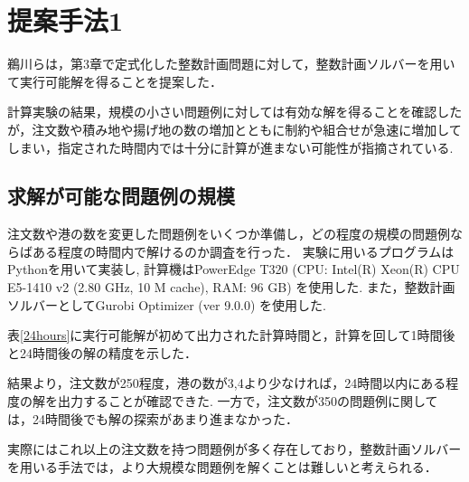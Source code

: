 \chapter{提案手法1}\label{method}

\label {gurobiの計算実験}
鵜川ら\cite{ukawa}は，第3章で定式化した整数計画問題に対して，整数計画ソルバーを用いて実行可能解を得ることを提案した．

計算実験の結果，規模の小さい問題例に対しては有効な解を得ることを確認したが，注文数や積み地や揚げ地の数の増加とともに制約や組合せが急速に増加してしまい，指定された時間内では十分に計算が進まない可能性が指摘されている.

\section{求解が可能な問題例の規模}
注文数や港の数を変更した問題例をいくつか準備し，どの程度の規模の問題例ならばある程度の時間内で解けるのか調査を行った．
実験に用いるプログラムは Pythonを用いて実装し, 計算機はPowerEdge T320 (CPU: Intel(R) Xeon(R) CPU E5-1410 v2 (2.80 GHz, 10 M cache), RAM: 96 GB) を使用した. また，整数計画ソルバーとしてGurobi Optimizer (ver 9.0.0) を使用した.

表\ref{24hours}に実行可能解が初めて出力された計算時間と，計算を回して1時間後と24時間後の解の精度を示した．

結果より，注文数が250程度，港の数が3,4より少なければ，24時間以内にある程度の解を出力することが確認できた.
一方で，注文数が350の問題例に関しては，24時間後でも解の探索があまり進まなかった．

実際にはこれ以上の注文数を持つ問題例が多く存在しており，整数計画ソルバーを用いる手法では，より大規模な問題例を解くことは難しいと考えられる．

